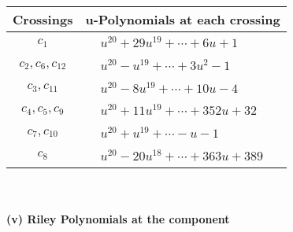 \documentclass[1p]{elsarticle_modified}
\theoremstyle{definition}
\begin{document}
\begin{tabular}{m{50pt}|m{274pt}}
Crossings & \hspace{64pt}u-Polynomials at each crossing \\
\hline $$\begin{aligned}c_{1}\end{aligned}$$&$\begin{aligned}
&u^{20}+29 u^{19}+\cdots+6 u+1
\end{aligned}$\\
\hline $$\begin{aligned}c_{2},c_{6},c_{12}\end{aligned}$$&$\begin{aligned}
&u^{20}- u^{19}+\cdots+3 u^2-1
\end{aligned}$\\
\hline $$\begin{aligned}c_{3},c_{11}\end{aligned}$$&$\begin{aligned}
&u^{20}-8 u^{19}+\cdots+10 u-4
\end{aligned}$\\
\hline $$\begin{aligned}c_{4},c_{5},c_{9}\end{aligned}$$&$\begin{aligned}
&u^{20}+11 u^{19}+\cdots+352 u+32
\end{aligned}$\\
\hline $$\begin{aligned}c_{7},c_{10}\end{aligned}$$&$\begin{aligned}
&u^{20}+u^{19}+\cdots- u-1
\end{aligned}$\\
\hline $$\begin{aligned}c_{8}\end{aligned}$$&$\begin{aligned}
&u^{20}-20 u^{18}+\cdots+363 u+389
\end{aligned}$\\
\hline
\end{tabular}\\~\\
\newpage\renewcommand{\arraystretch}{1}
\flushleft \textbf{(v) Riley Polynomials at the component}\newline \\
\end{document}
